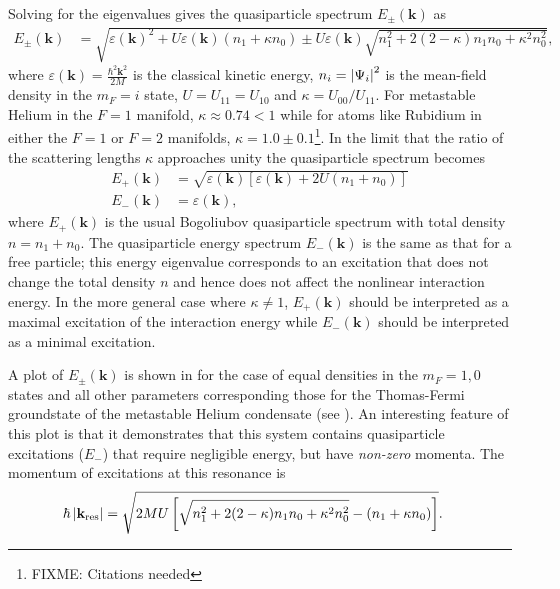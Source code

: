 Solving for the eigenvalues gives the quasiparticle spectrum $E_\pm(\mathbf{k})$ as
\begin{align}
    E_\pm(\mathbf{k}) &= \sqrt{\varepsilon(\mathbf{k})^2 + U \varepsilon(\mathbf{k}) (n_1 + \kappa n_0) \pm U \varepsilon(\mathbf{k})\sqrt{n_1^2 + 2 (2 - \kappa) n_1 n_0 + \kappa^2 n_0^2} },
    \label{Peaks:QuasiparticleSpectrum}
\end{align}
where $\displaystyle\varepsilon(\mathbf{k}) = \frac{\hbar^2 \mathbf{k}^2}{2M}$ is the classical kinetic energy, $n_i=\left|\Psi_i\right|^2$ is the mean-field density in the $m_F=i$ state, $U = U_{11} = U_{10}$ and $\kappa = U_{00}/U_{11}$. For metastable Helium in the $F=1$ manifold, $\kappa \approx 0.74 < 1$ while for atoms like Rubidium in either the $F=1$ or $F=2$ manifolds, $\kappa = 1.0 \pm 0.1$\footnote{FIXME: Citations needed}.  In the limit that the ratio of the scattering lengths $\kappa$ approaches unity the quasiparticle spectrum becomes
\begin{align}
    E_+(\mathbf{k}) &= \sqrt{\varepsilon(\mathbf{k})\left[\varepsilon(\mathbf{k}) + 2 U (n_1 + n_0) \right]} \label{Peaks:EPlusSimple}\\
    E_-(\mathbf{k}) &= \varepsilon(\mathbf{k}), \label{Peaks:EMinusSimple}
\end{align}
where $E_+(\mathbf{k})$ is the usual Bogoliubov quasiparticle spectrum \citep{Bogoliubov:1947} with total density $n = n_1 + n_0$. The quasiparticle energy spectrum $E_-(\mathbf{k})$ is the same as that for a free particle; this energy eigenvalue corresponds to an excitation that does not change the total density $n$ and hence does not affect the nonlinear interaction energy. In the more general case where $\kappa \neq 1$, $E_+(\mathbf{k})$ should be interpreted as a maximal excitation of the interaction energy while $E_-(\mathbf{k})$ should be interpreted as a minimal excitation.

A plot of $E_\pm(\mathbf{k})$ is shown in  for the case of equal densities in the $m_F=1, 0$ states and all other parameters corresponding those for the Thomas-Fermi groundstate of the metastable Helium condensate (see ). An interesting feature of this plot is that it demonstrates that this system contains quasiparticle excitations ($E_-$) that require negligible energy, but have \emph{non-zero} momenta. The momentum of excitations at this resonance is
\begin{align}
    \hbar \abs{\mathbf{k}_\text{res}} &= \sqrt{2 M U \left[\sqrt{n_1^2 + 2(2 - \kappa)n_1 n_0 + \kappa^2 n_0^2} - (n_1 + \kappa n_0)\right]}. \label{Peaks:BogResonantWavenumber}
\end{align}



